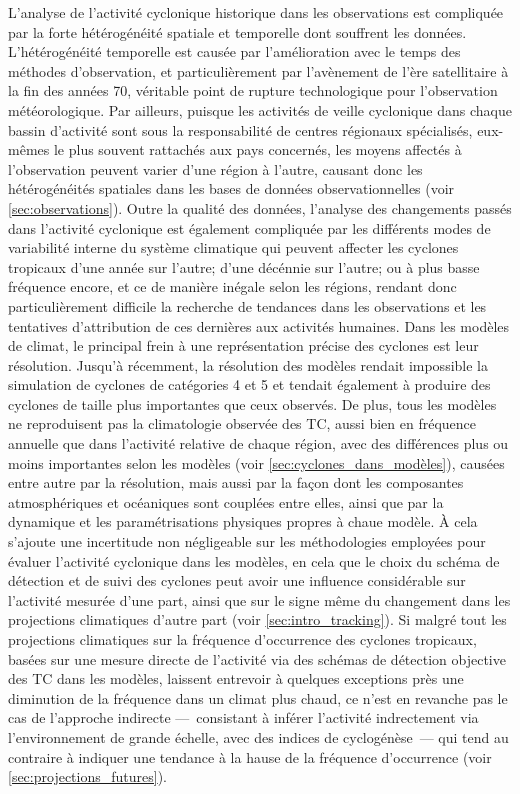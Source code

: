 \documentclass[../main.tex]{subfiles}
\begin{document}
L'analyse de l'activité cyclonique historique dans les observations est compliquée par la forte hétérogénéité spatiale et temporelle dont souffrent les données.
L'hétérogénéité temporelle est causée par l'amélioration avec le temps des méthodes d'observation, et particulièrement par l'avènement de l'ère satellitaire à
la fin des années \num{70}, véritable point de rupture technologique pour l'observation météorologique. Par ailleurs, puisque les activités de veille cyclonique
dans chaque bassin d'activité sont sous la responsabilité de centres régionaux spécialisés, eux-mêmes le plus souvent rattachés aux pays concernés, les moyens
affectés à l'observation peuvent varier d'une région à l'autre, causant donc les hétérogénéités spatiales dans les bases de données observationnelles (voir
\cref{sec:observations}). Outre la qualité des données, l'analyse des changements passés dans l'activité cyclonique est également compliquée par les différents
modes de variabilité interne du système climatique qui peuvent affecter les cyclones tropicaux d'une année sur l'autre; d'une décénnie sur l'autre; ou à plus
basse fréquence encore, et ce de manière inégale selon les régions, rendant donc particulièrement difficile la recherche de tendances dans les observations et
les tentatives d'attribution de ces dernières aux activités humaines. Dans les modèles de climat, le principal frein à une représentation précise des cyclones
est leur résolution. Jusqu'à récemment, la résolution des modèles rendait impossible la simulation de cyclones de catégories \num{4} et \num{5} et tendait
également à produire des cyclones de taille plus importantes que ceux observés. De plus, tous les modèles ne reproduisent pas la climatologie observée des TC,
aussi bien en fréquence annuelle que dans l'activité relative de chaque région, avec des différences plus ou moins importantes selon les modèles (voir
\cref{sec:cyclones_dans_modèles}), causées entre autre par la résolution, mais aussi par la façon dont les composantes atmosphériques et océaniques sont
couplées entre elles, ainsi que par la dynamique et les paramétrisations physiques propres à chaue modèle. À cela s'ajoute une incertitude non négligeable sur
les méthodologies employées pour évaluer l'activité cyclonique dans les modèles, en cela que le choix du schéma de détection et de suivi des cyclones peut avoir
une influence considérable sur l'activité mesurée d'une part, ainsi que sur le signe même du changement dans les projections climatiques d'autre part (voir
\cref{sec:intro_tracking}). Si malgré tout les projections climatiques sur la fréquence d'occurrence des cyclones tropicaux, basées sur une mesure directe de
l'activité via des schémas de détection objective des TC dans les modèles, laissent entrevoir à quelques exceptions près une diminution de la fréquence dans un
climat plus chaud, ce n'est en revanche pas le cas de l'approche indirecte ---~consistant à inférer l'activité indrectement via l'environnement de grande
échelle, avec des indices de cyclogénèse~--- qui tend au contraire à indiquer une tendance à la hause de la fréquence d'occurrence (voir
\cref{sec:projections_futures}).
\end{document}
